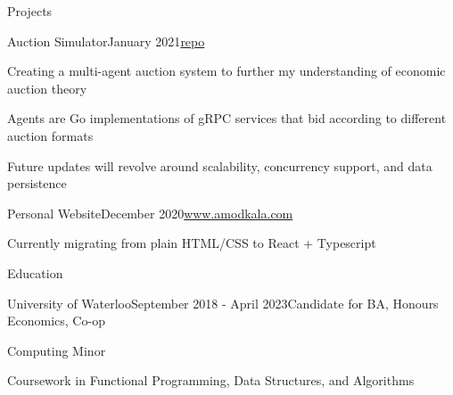 \documentclass{resume} %
\begin{document}
	\begin{rSection}{Projects}
	
	    \begin{rSubsection}{Auction Simulator}{January 2021}{\href{https://www.github.com/amodkala/auction}{repo}}{}
			\item Creating a multi-agent auction system to further my understanding of economic auction theory
			\item Agents are Go implementations of gRPC services that bid according to different auction formats
			\item Future updates will revolve around scalability, concurrency support, and data persistence
		\end{rSubsection}
	
	   \begin{rSubsection}{Personal Website}{December 2020}{\href{https://www.amodkala.com}{www.amodkala.com}}{}
			\item Currently migrating from plain HTML/CSS to React + Typescript
		\end{rSubsection}   
		
	\end{rSection}

	\begin{rSection}{Education}

		\begin{rSubsection}{University of Waterloo}{September 2018 - April 2023}{Candidate for BA, Honours Economics, Co-op}{}
		    \item Computing Minor
			\item Coursework in Functional Programming, Data Structures, and Algorithms
		\end{rSubsection}

	\end{rSection}
\end{document}

